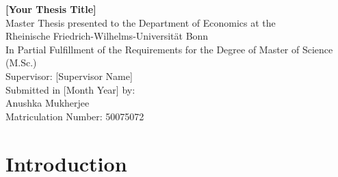\documentclass[12pt,a4paper]{article}%
\begin{document}
\begin{titlepage}
  \centering
  \vspace*{5cm}
  {\Huge \textbf{[Your Thesis Title]}}\\[2cm]
  {\large Master Thesis presented to the Department of Economics at the}\\
  {\large Rheinische Friedrich-Wilhelms-Universität Bonn}\\[1cm]
  {\large In Partial Fulfillment of the Requirements for the Degree of Master of Science (M.Sc.)}\\[2cm]
  Supervisor: [Supervisor Name] \\[0.5cm]
  Submitted in [Month Year] by: \\[0.2cm]
  Anushka Mukherjee \\[0.2cm]
  Matriculation Number: 50075072
  \vfill
\end{titlepage}

\tableofcontents
\thispagestyle{empty}
\newpage

\setcounter{page}{1}


\section{Introduction}
\lipsum[1-2] %
\end{document}
